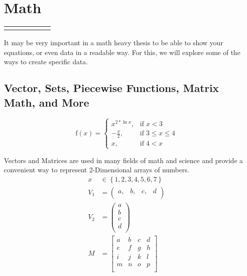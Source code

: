 	\section{Math}
		
		
		\begin{table}
			\begin{tabularx}{0.85\textwidth}{CCCCCC}
				\alpha
			\end{tabularx}
		\end{table}
  
    It may be very important in a math heavy thesis to be able to show your equations, or even data in a readable way. For this, we will explore some of the ways to create specific data.
    
        \subsection{Vector, Sets, Piecewise Functions, Matrix Math, and More}
        
        \begin{equation}
            \text{f}(x) = 
                \begin{cases}
                    x^{2*\ln{x}},&\text{if }x<3\\
                    -\frac{x}{2},&\text{if }3\leq{}x\leq{}4\\
                    x,&\text{if }4<x
                \end{cases}
        \end{equation}
        
        Vectors and Matrices are used in many fields of math and science and provide a convenient way to represent 2-Dimensional arrays of numbers.
            \begin{align}
                x&\in{}\left\{1,2,3,4,5,6,7\right\}\\
                V_{1} &= {\left(
                \begin{array}{cccc}
                    a, & b, & c, & d\\
                \end{array}
                \right)}\\
                V_{2} &= \left(
                \begin{array}{c}
                    a \\
                    b \\
                    c \\
                    d \\
                \end{array}
                \right)\\
                M &= {\left[
                \begin{array}{cccc}
                    a & b & c & d\\
                    e & f & g & h\\
                    i & j & k & l\\
                    m & n & o & p\\
                \end{array}
                \right]}
            \end{align}

  \printreferences %
